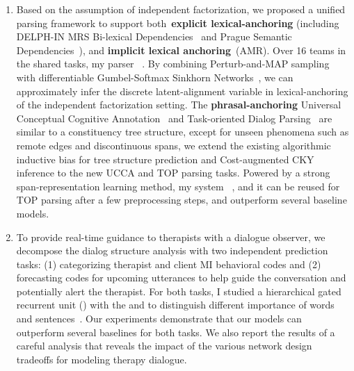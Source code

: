 \begin{enumerate}
\item Based on the assumption of independent factorization, we
  proposed a unified parsing framework to support
  both~\textbf{explicit lexical-anchoring} (including DELPH-IN MRS
  Bi-lexical Dependencies~\citep[DM,][]{ivanova2012did} and Prague
  Semantic
  Dependencies~\citep[PSD,][]{hajic2012announcing,miyao2014house}),
  and \textbf{implicit lexical anchoring}~(AMR). Over 16 teams in the
  shared tasks, my parser~\citep{cao2019amazon} . By combining Perturb-and-MAP
  sampling~\citep{papandreouperturb} with differentiable
  Gumbel-Softmax Sinkhorn Networks~\citep{mena2018learning}, we can
  approximately infer the discrete latent-alignment variable in
  lexical-anchoring of the independent factorization setting. The
  \textbf{phrasal-anchoring} Universal Conceptual Cognitive
  Annotation~\citep[UCCA,][]{abend2013universal} and Task-oriented
  Dialog Parsing~\citep[TOP,][]{gupta-etal-2018-semantic-parsing} are
  similar to a constituency tree structure, except for unseen phenomena
  such as remote edges and discontinuous spans, we extend the existing
  algorithmic inductive bias for tree structure prediction and
  Cost-augmented CKY inference to the new UCCA and TOP parsing
  tasks. Powered by a strong span-representation learning method, my
  system~\citep{cao2019amazon} , and
  it can be reused for TOP parsing after a few preprocessing steps,
  and outperform several baseline models.

\item To provide real-time guidance to therapists with a dialogue
  observer, we decompose the dialog structure analysis with two
  independent prediction tasks: (1) categorizing therapist and client
  MI behavioral codes and (2) forecasting codes for upcoming
  utterances to help guide the conversation and potentially alert the
  therapist. For both tasks, I studied a hierarchical gated recurrent
  unit (\HGRU) with the  and
   to distinguish different importance of
  words and sentences~\citep{jie2019psycdialacl}. Our experiments
  demonstrate that our models can outperform several baselines for
  both tasks. We also report the results of a careful analysis that
  reveals the impact of the various network design tradeoffs for
  modeling therapy dialogue.


\end{enumerate}

